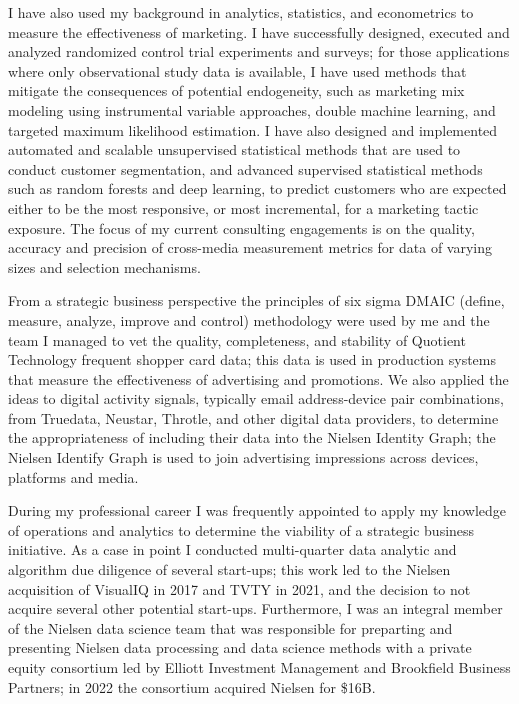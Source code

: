 \vspace{2.0ex}

I have also used my background in analytics, statistics, and econometrics to measure the effectiveness of marketing. I have successfully designed, executed and analyzed randomized control trial experiments and surveys; for those applications where only observational study data is available, I have used methods that mitigate the consequences of potential endogeneity, such as marketing mix modeling using instrumental variable approaches, double machine learning, and targeted maximum likelihood estimation.  I have also designed and implemented automated and scalable unsupervised statistical methods that are used to conduct customer segmentation, and advanced supervised statistical methods such as random forests and deep learning, to predict customers who are expected either to be the most responsive, or most incremental, for a marketing tactic exposure.  The focus of my current consulting engagements is on the quality, accuracy and precision of cross-media measurement metrics for data of varying sizes and selection mechanisms.%

\newpage

From a strategic business perspective the principles of six sigma DMAIC (define, measure, analyze, improve and control) methodology were used by me and the team I managed to vet the quality, completeness, and stability of Quotient Technology frequent shopper card data;   this data is used in production systems that measure the effectiveness of advertising and promotions. We also applied the ideas to digital activity signals, typically email address-device pair combinations, from Truedata, Neustar, Throtle, and other digital data providers, to determine the appropriateness of including their data into the Nielsen Identity Graph; the Nielsen Identify Graph is used to join advertising impressions across devices, platforms and media.  

\vspace{2.0ex}

During my professional career I was frequently appointed to apply my knowledge of operations and analytics to determine the viability of a strategic business initiative.  As a case in point I conducted multi-quarter data analytic and algorithm due diligence of several start-ups;  this work led to the Nielsen acquisition of VisualIQ in 2017 and TVTY in 2021, and the decision to not acquire several other potential start-ups.  Furthermore, I was an integral member of the Nielsen data science team that was responsible for preparting and presenting Nielsen data processing and data science methods with a private equity consortium led by Elliott Investment Management and Brookfield Business Partners;  in 2022 the consortium acquired Nielsen for \$16B. 

